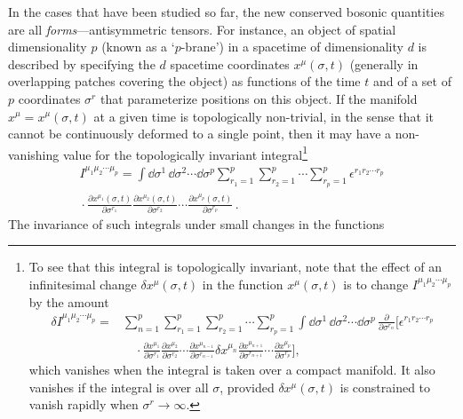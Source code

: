 In the cases that have been studied so far, the new conserved bosonic
quantities are all \emph{forms}---antisymmetric tensors. For instance, an
object of spatial dimensionality \(p\) (known as a `\(p\)-brane') in a
spacetime of dimensionality \(d\) is described by specifying the \(d\)
spacetime coordinates \(x^\mu(\sigma,t)\) (generally in overlapping
patches covering the object) as functions of the time \(t\) and of a set
of \(p\) coordinates \(\sigma^r\) that parameterize positions on this
object. If the manifold \(x^\mu=x^\mu(\sigma,t)\) at a given time is
topologically non-trivial, in the sense that it cannot be continuously
deformed to a single point, then it may have a non-vanishing value for the
topologically invariant integral\footnote{To see that this integral is
topologically invariant, note that the effect of an infinitesimal change
\(\delta x^\mu(\sigma,t)\) in the function \(x^\mu(\sigma,t)\) is to
change \(I^{\mu_1\mu_2\cdots\mu_p}\) by the amount
\[
  \begin{aligned}
  \delta I^{\mu_1\mu_2\cdots\mu_p}
  ={}&\sum_{n=1}^p\sum_{r_1=1}^p\sum_{r_2=1}^p\cdots\sum_{r_p=1}^p
    \int \dd\sigma^1\,\dd\sigma^2\cdots \dd\sigma^p\,
    \frac{\partial}{\partial\sigma^{r_n}}
    \Biggl[
      \epsilon^{r_1r_2\cdots r_p}\\
  &\quad{}\cdot
      \frac{\partial x^{\mu_1}}{\partial\sigma^{r_1}}
      \frac{\partial x^{\mu_2}}{\partial\sigma^{r_2}}
      \cdots
      \frac{\partial x^{\mu_{n-1}}}{\partial\sigma^{r_{n-1}}}
      \delta x^{\mu_n}
      \frac{\partial x^{\mu_{n+1}}}{\partial\sigma^{r_{n+1}}}
      \cdots
      \frac{\partial x^{\mu_p}}{\partial\sigma^{r_p}}
    \Biggr],
  \end{aligned}
\]
which vanishes when the integral is taken over a compact manifold. It also
vanishes if the integral is over all \(\sigma\), provided
\(\delta x^\mu(\sigma,t)\) is constrained to vanish rapidly when
\(\sigma^r\longrightarrow\infty\).}
\begin{multline}
  I^{\mu_1\mu_2\cdots\mu_p}
  =\int \dd\sigma^1\,\dd\sigma^2\cdots \dd\sigma^p
    \sum_{r_1=1}^p\sum_{r_2=1}^p\cdots\sum_{r_p=1}^p
    \epsilon^{r_1r_2\cdots r_p}\\
  {}\cdot
    \frac{\partial x^{\mu_1}(\sigma,t)}{\partial\sigma^{r_1}}
    \frac{\partial x^{\mu_2}(\sigma,t)}{\partial\sigma^{r_2}}
    \cdots
    \frac{\partial x^{\mu_p}(\sigma,t)}{\partial\sigma^{r_p}}\,.
  \tag{32.3.1}\label{eq:32.3.1}
\end{multline}
The invariance of such integrals under small changes in the functions
